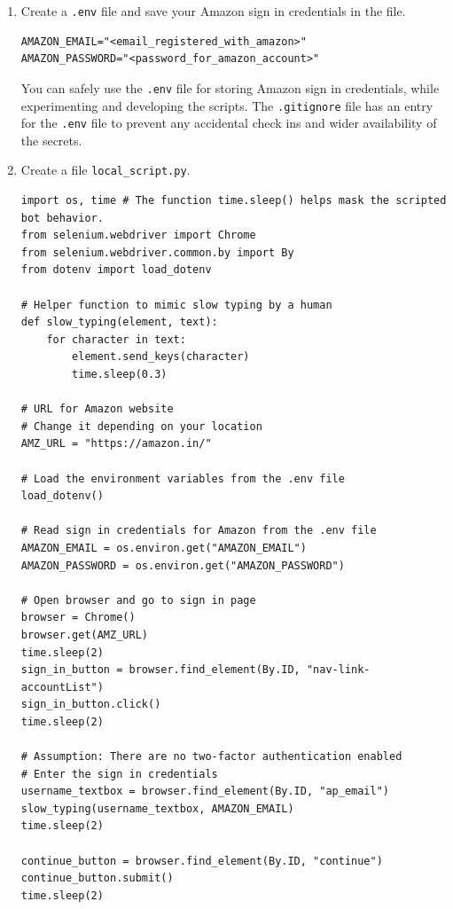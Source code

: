 \documentclass{article}
\begin{document}
\begin{enumerate}
    \item Create a \texttt{.env} file and save your Amazon sign in credentials in the file.

\begin{lstlisting}[style=bash]
AMAZON_EMAIL="<email_registered_with_amazon>"
AMAZON_PASSWORD="<password_for_amazon_account>"
\end{lstlisting}

\begin{tcolorbox}[colback=blue!5!white,colframe=blue!75!black,title=Note]
You can safely use the \texttt{.env} file for storing Amazon sign in credentials, while experimenting and developing the scripts. The \texttt{.gitignore} file has an entry for the \texttt{.env} file to prevent any accidental check ins and wider availability of the secrets.
\end{tcolorbox}

    \item Create a file \texttt{local\_script.py}.

\begin{lstlisting}[style=python]
import os, time # The function time.sleep() helps mask the scripted bot behavior.
from selenium.webdriver import Chrome
from selenium.webdriver.common.by import By
from dotenv import load_dotenv

# Helper function to mimic slow typing by a human
def slow_typing(element, text):
    for character in text: 
        element.send_keys(character)
        time.sleep(0.3)

# URL for Amazon website
# Change it depending on your location
AMZ_URL = "https://amazon.in/"

# Load the environment variables from the .env file
load_dotenv()

# Read sign in credentials for Amazon from the .env file
AMAZON_EMAIL = os.environ.get("AMAZON_EMAIL")
AMAZON_PASSWORD = os.environ.get("AMAZON_PASSWORD")

# Open browser and go to sign in page
browser = Chrome()
browser.get(AMZ_URL)
time.sleep(2)
sign_in_button = browser.find_element(By.ID, "nav-link-accountList")
sign_in_button.click()
time.sleep(2)

# Assumption: There are no two-factor authentication enabled
# Enter the sign in credentials
username_textbox = browser.find_element(By.ID, "ap_email")
slow_typing(username_textbox, AMAZON_EMAIL)
time.sleep(2)

continue_button = browser.find_element(By.ID, "continue")
continue_button.submit()
time.sleep(2)


\end{lstlisting}
\end{enumerate}
\end{document}
